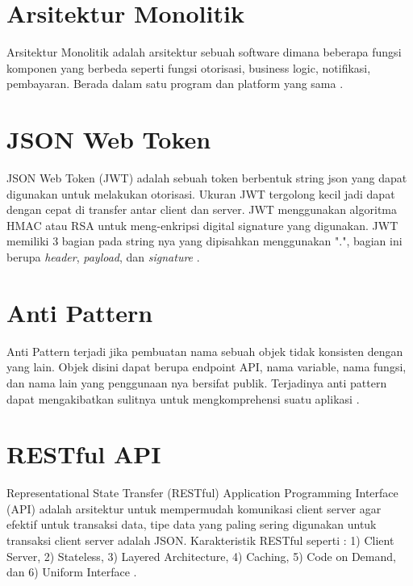 \section{Arsitektur Monolitik}
Arsitektur Monolitik adalah arsitektur sebuah software dimana beberapa fungsi komponen yang berbeda seperti fungsi otorisasi, business logic, notifikasi, pembayaran. Berada dalam satu program dan platform yang sama \cite{gos2020comparison}. 


\section{JSON Web Token}
JSON Web Token (JWT) adalah sebuah token berbentuk string json yang dapat digunakan untuk melakukan otorisasi. Ukuran JWT tergolong kecil jadi dapat dengan cepat di transfer antar client dan server. JWT menggunakan algoritma HMAC atau RSA untuk meng-enkripsi digital signature yang digunakan. JWT memiliki 3 bagian pada string nya yang dipisahkan menggunakan ".", bagian ini berupa \textit{header}, \textit{payload}, dan \textit{signature} \cite{rahmatullo2019stateless}.

\section{Anti Pattern}
Anti Pattern terjadi jika pembuatan nama sebuah objek tidak konsisten dengan yang lain. Objek disini dapat berupa endpoint API, nama variable, nama fungsi, dan nama lain yang penggunaan nya bersifat publik. Terjadinya anti pattern dapat mengakibatkan sulitnya untuk mengkomprehensi suatu aplikasi \cite{Aghajani2018} \cite{Alshraiedeh2021}.

\section{RESTful API}
Representational State Transfer (RESTful) Application Programming Interface (API) adalah arsitektur untuk mempermudah komunikasi client server agar efektif untuk transaksi data, tipe data yang paling sering digunakan untuk transaksi client server adalah JSON. Karakteristik RESTful seperti : 1) Client Server, 2) Stateless, 3) Layered Architecture, 4) Caching, 5) Code on Demand, dan 6) Uniform Interface \cite{giessler2015best}.


